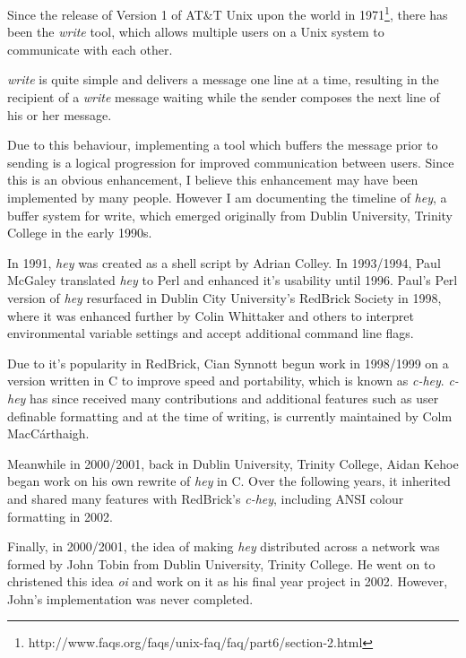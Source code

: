 Since the release of Version 1 of AT\&T Unix upon the world 
in 1971\footnote{http://www.faqs.org/faqs/unix-faq/faq/part6/section-2.html}, 
there has been the \emph{write} tool, which allows multiple users on a Unix 
system to communicate with each other.


\emph{write} is quite simple and delivers a message one line at a time,
resulting in the recipient of a \emph{write} message waiting while the
sender composes the next line of his or her message.


Due to this behaviour, implementing a tool which buffers the message
prior to sending is a logical progression for improved communication
between users. Since this is an obvious enhancement, I believe this
enhancement may have been implemented by many people. However I am 
documenting the timeline of \emph{hey}, a buffer system for write,
which emerged originally from Dublin University, Trinity College in the 
early 1990s.


In 1991, \emph{hey} was created as a shell script by Adrian Colley. In 
1993/1994, Paul McGaley translated \emph{hey} to Perl and enhanced it's 
usability until 1996. Paul's Perl version of \emph{hey} resurfaced in 
Dublin City University's RedBrick Society in 1998, where it was enhanced
further by Colin Whittaker and others to interpret environmental variable 
settings and accept additional command line flags.


Due to it's popularity in RedBrick, Cian Synnott begun work in 1998/1999
on a version written in C to improve speed and portability, which is 
known as \emph{c-hey}. \emph{c-hey} has since received many 
contributions and additional features such as user definable formatting 
and at the time of writing, is currently maintained by Colm 
MacC\'{a}rthaigh.


Meanwhile in 2000/2001, back in Dublin University, Trinity College, Aidan 
Kehoe began work on his own rewrite of \emph{hey} in C. Over the 
following years, it inherited and shared many features with RedBrick's 
\emph{c-hey}, including ANSI colour formatting in 2002.


Finally, in 2000/2001, the idea of making \emph{hey} distributed across 
a network was formed by John Tobin from Dublin University, Trinity 
College.  He went on to christened this idea \emph{oi} and work on it 
as his final year project in 2002. However, John's implementation was
never completed.
